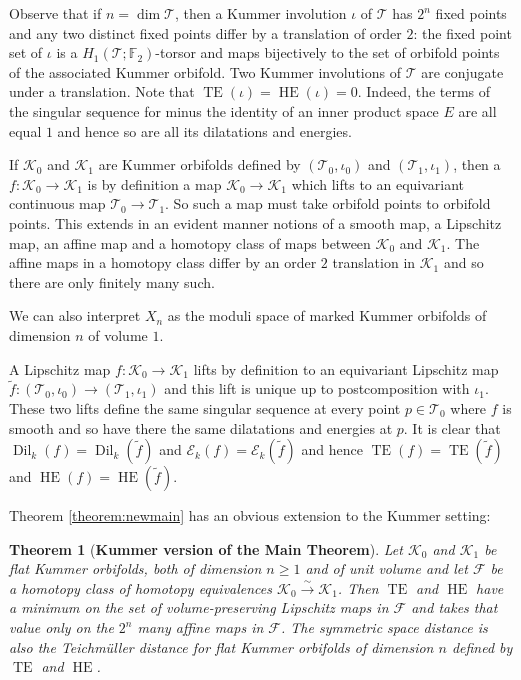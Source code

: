 \documentclass[11pt,letterpaper]{amsart}
\newtheorem{theorem}{Theorem}[section]
\theoremstyle{definition}
\numberwithin{equation}{section}
\theoremstyle{definition}
\newcommand{\Ec}{\mathcal{E}}
\newcommand{\Fc}{\mathcal{F}}
\newcommand{\Kc}{\mathcal{K}}
\newcommand{\Tc}{\mathcal{T}}
\newcommand{\Fb}{\mathbb{F}}
\DeclareMathOperator{\TE}{TE}
\DeclareMathOperator{\HE}{HE}
\newcommand{\Dil}{\operatorname{Dil}}
\begin{document}
Observe that if  $n=\dim \Tc$, then a Kummer involution $\iota$ of $\Tc$ has $2^n$ fixed points and any two distinct fixed points differ by a translation  of order $2$: the fixed point set of $\iota$ is a $H_1(\Tc; \Fb_2)$-torsor and maps bijectively to the set of orbifold points of the associated  Kummer orbifold. Two  Kummer involutions of $\Tc$  are conjugate under a  translation.
Note that $\TE(\iota)=\HE(\iota)=0$. Indeed, the  terms of the singular sequence for minus the identity of an inner product space $E$ are all equal $1$ and hence so are all its dilatations and energies.

If $\Kc_0$ and $\Kc_1$ are Kummer orbifolds defined by $(\Tc_0, \iota_0)$  and  $(\Tc_1, \iota_1)$, then a   $f:\Kc_0\to \Kc_1$ is by definition a map $\Kc_0\to \Kc_1$ which lifts to an equivariant  continuous map $\Tc_0\to \Tc_1$. So such a map must take orbifold points to orbifold points. This extends in an evident manner notions of a smooth map, a Lipschitz map, an affine map  and a homotopy class of maps between $\Kc_0$ and $\Kc_1$. The affine maps in a homotopy class differ by an order $2$ translation in $\Kc_1$ and so there are only finitely many such.

We can also interpret $X_n$ as the moduli space of marked  Kummer orbifolds of dimension $n$ of volume  $1$.


A  Lipschitz map $f:\Kc_0\to\Kc_1$ lifts by definition to an equivariant 
 Lipschitz map  $\tilde f: (\Tc_0, \iota_0)\to (\Tc_1, \iota_1)$ and this lift is unique up to postcomposition with $\iota_1$. These two  lifts  define the same singular sequence at every point $p\in \Tc_0$ where $f$ is smooth and so  have there the same dilatations and energies at $p$. It is clear that  $\Dil_k(f)=\Dil_k(\tilde f)$ and $\Ec_k(f)=\Ec_k(\tilde f)$ and hence $\TE(f)=\TE(\tilde f)$  and $\HE(f)=\HE(\tilde f)$.


Theorem \ref{theorem:newmain} has an obvious extension to the Kummer setting:

\begin{theorem}[{\bf Kummer version of the Main Theorem}] \label{theorem:kummermain}
Let $\Kc_0$ and $\Kc_1$ be flat Kummer orbifolds, both of dimension $n\ge 1$ and  of unit volume and let $\Fc$ be a homotopy class of homotopy equivalences $\Kc_0\xrightarrow{\sim} \Kc_1$.  Then  $\TE$ and $\HE$ have a minimum on the set of \emph{volume-preserving} Lipschitz  maps in $\Fc$ and takes that  value only  on the $2^n$ many affine maps  in $\Fc$.
The symmetric space distance is also the  Teichm\"uller distance for flat Kummer orbifolds of dimension $n$ defined by $\TE$ and $\HE$. 
\end{theorem}
\end{document}
